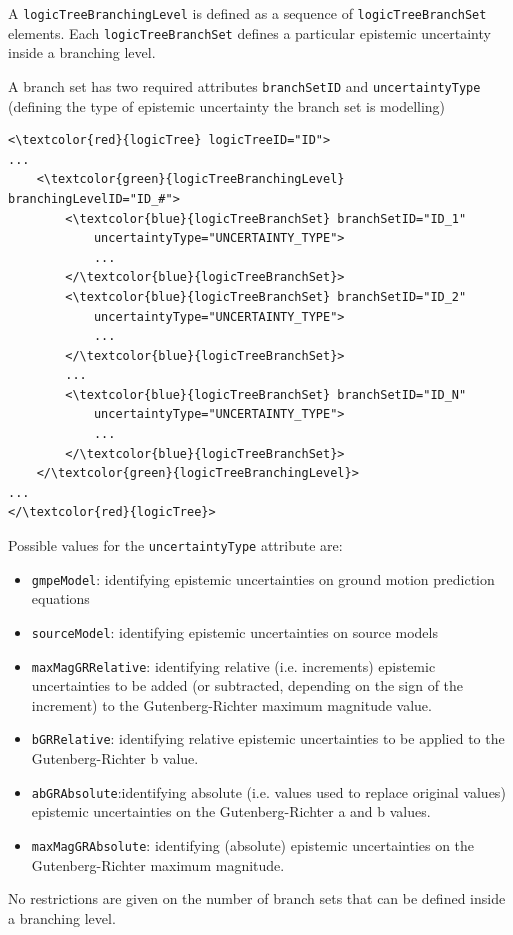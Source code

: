 A \Verb+logicTreeBranchingLevel+ is defined as a sequence of 
\Verb+logicTreeBranchSet+ elements. Each \Verb+logicTreeBranchSet+ 
defines a particular epistemic uncertainty inside a branching level. 

A branch set has two required attributes \Verb+branchSetID+ and 
\Verb+uncertaintyType+ (defining the type of epistemic uncertainty 
the branch set is modelling)
\begin{Verbatim}[frame=single, commandchars=\\\{\}]
<\textcolor{red}{logicTree} logicTreeID="ID">
...
	<\textcolor{green}{logicTreeBranchingLevel} branchingLevelID="ID_#">
		<\textcolor{blue}{logicTreeBranchSet} branchSetID="ID_1"
			uncertaintyType="UNCERTAINTY_TYPE">
			...
		</\textcolor{blue}{logicTreeBranchSet}>
		<\textcolor{blue}{logicTreeBranchSet} branchSetID="ID_2"
			uncertaintyType="UNCERTAINTY_TYPE">
			...
		</\textcolor{blue}{logicTreeBranchSet}>
		...
		<\textcolor{blue}{logicTreeBranchSet} branchSetID="ID_N"
			uncertaintyType="UNCERTAINTY_TYPE">
			...
		</\textcolor{blue}{logicTreeBranchSet}>
	</\textcolor{green}{logicTreeBranchingLevel}>
...
</\textcolor{red}{logicTree}>
\end{Verbatim}
Possible values for the \Verb+uncertaintyType+ attribute are:
\label{list_epistemic_unc}
\begin{itemize}
\item \Verb+gmpeModel+: identifying epistemic uncertainties on ground 
motion prediction equations
\item \Verb+sourceModel+: identifying epistemic uncertainties on source models
\item \Verb+maxMagGRRelative+: identifying relative (i.e. increments)
	epistemic uncertainties to be added (or subtracted, depending on 
	the sign of the increment) to the Guten\-berg-Richter maximum 
	magnitude value.
\item \Verb+bGRRelative+: identifying relative epistemic uncertainties 
	to be applied to the Guten\-berg-Richter b value.
\item \Verb+abGRAbsolute+:identifying absolute (i.e. values used to replace
 	original values) epistemic uncertainties on the 
	Guten\-berg-Richter a and b values.
\item \Verb+maxMagGRAbsolute+: identifying (absolute) epistemic 
	uncertainties on the Guten\-berg-Richter maximum magnitude.
\end{itemize}
No restrictions are given on the number of branch sets that can be defined 
inside a branching level.

